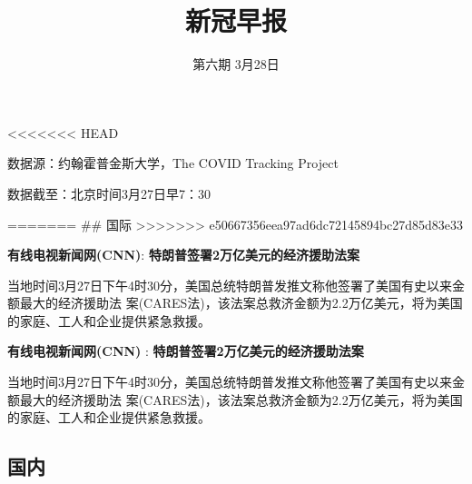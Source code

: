 \documentclass[11,]{article}
\title{\textcolor{glaucous}{新冠早报}}
\author{\textcolor{glaucous}{第六期 3月28日}}
\date{}
\begin{document}
\maketitle

\newcommand{\resheading}[1]{%
  \noindent\fcolorbox{lavenderblush}{lavenderblush}{\makebox[\dimexpr\textwidth-2\fboxsep-2\fboxrule][l]{\textbf{~#1}}}%
}

\pagestyle{fancyplain}

%
  \noindent{}%

\textless{}\textless{}\textless{}\textless{}\textless{}\textless{}\textless{}
HEAD %

数据源：约翰霍普金斯大学，The COVID Tracking Project

数据截至：北京时间3月27日早7：30

======= \#\# \textcolor{glaucous}{国际}
\textgreater{}\textgreater{}\textgreater{}\textgreater{}\textgreater{}\textgreater{}\textgreater{}
e50667356eea97ad6dc72145894bc27d85d83e33

\textbf{\textcolor{glaucous}{有线电视新闻网(CNN)}}:
\textbf{特朗普签署2万亿美元的经济援助法案}

当地时间3月27日下午4时30分，美国总统特朗普发推文称他签署了美国有史以来金额最大的经济援助法
案(CARES法)，该法案总救济金额为2.2万亿美元，将为美国的家庭、工人和企业提供紧急救援。

\textbf{\textcolor{glaucous}{有线电视新闻网(CNN)}} :
\textbf{特朗普签署2万亿美元的经济援助法案}

当地时间3月27日下午4时30分，美国总统特朗普发推文称他签署了美国有史以来金额最大的经济援助法
案(CARES法)，该法案总救济金额为2.2万亿美元，将为美国的家庭、工人和企业提供紧急救援。

\hypertarget{section}{%
\subsection{\texorpdfstring{\textcolor{glaucous}{国内}}{}}\label{section}}
\end{document}
